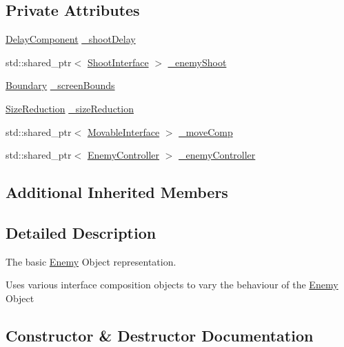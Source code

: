 \subsection*{Private Attributes}
\begin{DoxyCompactItemize}
\item 
\hyperlink{class_delay_component}{Delay\+Component} \hyperlink{class_enemy_a3c5bc99471cfa718af8e11b3b735d15c}{\+\_\+shoot\+Delay}
\item 
std\+::shared\+\_\+ptr$<$ \hyperlink{class_shoot_interface}{Shoot\+Interface} $>$ \hyperlink{class_enemy_aab1e06a64c7fc2d07d40522a7a7cf8be}{\+\_\+enemy\+Shoot}
\item 
\hyperlink{class_boundary}{Boundary} \hyperlink{class_enemy_afb32f85ca2f3dce003e62a91572bdb70}{\+\_\+screen\+Bounds}
\item 
\hyperlink{class_size_reduction}{Size\+Reduction} \hyperlink{class_enemy_af8b4d39339f59407b7fd9cd1d6246860}{\+\_\+size\+Reduction}
\item 
std\+::shared\+\_\+ptr$<$ \hyperlink{class_movable_interface}{Movable\+Interface} $>$ \hyperlink{class_enemy_a1776f87f0a6993e9e3255c8a41c73809}{\+\_\+move\+Comp}
\item 
std\+::shared\+\_\+ptr$<$ \hyperlink{class_enemy_controller}{Enemy\+Controller} $>$ \hyperlink{class_enemy_acc360bdd3b46cea29891f534af2153c8}{\+\_\+enemy\+Controller}
\end{DoxyCompactItemize}
\subsection*{Additional Inherited Members}


\subsection{Detailed Description}
The basic \hyperlink{class_enemy}{Enemy} Object representation. 

Uses various interface composition objects to vary the behaviour of the \hyperlink{class_enemy}{Enemy} Object 

\subsection{Constructor \& Destructor Documentation}
\mbox{\label{class_enemy_a0e382a7495bdbb9b802d1ed3931b4fc1}} 
